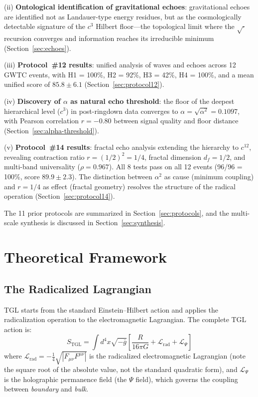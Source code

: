 \documentclass[12pt,a4paper,twocolumn]{article}
\newcommand{\alphaii}{\alpha^{2}}
\newcommand{\Psifield}{\Psi}
\newcommand{\boundary}{\textit{boundary}}
\newcommand{\bulk}{\textit{bulk}}
\begin{document}
(ii) \textbf{Ontological identification of gravitational echoes}: gravitational echoes are identified not as Landauer-type energy residues, but as the cosmologically detectable signature of the $c^3$ Hilbert floor---the topological limit where the $\sqrt{\cdot}$ recursion converges and information reaches its irreducible minimum (Section~\ref{sec:echoes}).

(iii) \textbf{Protocol~\#12 results}: unified analysis of waves and echoes across 12 GWTC events, with H1 = 100\%, H2 = 92\%, H3 = 42\%, H4 = 100\%, and a mean unified score of $85.8 \pm 6.1$ (Section~\ref{sec:protocol12}).

(iv) \textbf{Discovery of $\alpha$ as natural echo threshold}: the floor of the deepest hierarchical level ($c^3$) in post-ringdown data converges to $\alpha = \sqrt{\alphaii} = 0.1097$, with Pearson correlation $r = -0.80$ between signal quality and floor distance (Section~\ref{sec:alpha-threshold}).

(v) \textbf{Protocol~\#14 results}: fractal echo analysis extending the hierarchy to $c^{12}$, revealing contraction ratio $r = (1/2)^2 = 1/4$, fractal dimension $d_f = 1/2$, and multi-band universality ($\rho = 0.967$). All 8 tests pass on all 12 events (96/96 = 100\%, score $89.9 \pm 2.3$). The distinction between $\alphaii$ as cause (minimum coupling) and $r = 1/4$ as effect (fractal geometry) resolves the structure of the radical operation (Section~\ref{sec:protocol14}).

The 11 prior protocols are summarized in Section~\ref{sec:protocols}, and the multi-scale synthesis is discussed in Section~\ref{sec:synthesis}.


\section{Theoretical Framework}
\label{sec:framework}

\subsection{The Radicalized Lagrangian}

TGL starts from the standard Einstein--Hilbert action and applies the radicalization operation to the electromagnetic Lagrangian. The complete TGL action is:
\begin{equation}
\label{eq:action}
S_{\text{TGL}} = \int d^4x \sqrt{-\bar{g}} \left[ \frac{R}{16\pi G} + \mathcal{L}_{\text{rad}} + \mathcal{L}_\Psifield \right]
\end{equation}
where $\mathcal{L}_{\text{rad}} = -\frac{1}{4}\sqrt{|F_{\mu\nu}F^{\mu\nu}|}$ is the radicalized electromagnetic Lagrangian (note the square root of the absolute value, not the standard quadratic form), and $\mathcal{L}_\Psifield$ is the holographic permanence field (the $\Psifield$ field), which governs the coupling between \boundary{} and \bulk.
\end{document}
